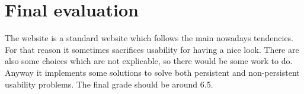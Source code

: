 \section{Final evaluation}
The website is a standard website which follows the main nowadays tendencies.
For that reason it sometimes sacrifices usability for having a nice look.
There are also some choices which are not explicable, so there would be some work to do.
Anyway it implements some solutions to solve both persistent and non-persistent usability
problems.
The final grade should be around 6.5.